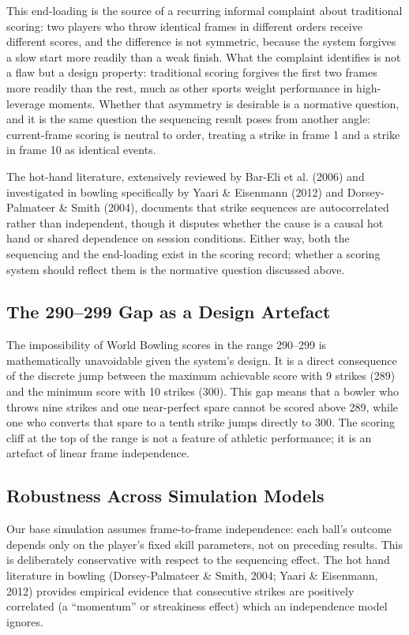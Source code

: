 \documentclass[
  letterpaper,
  DIV=11,
  numbers=noendperiod]{scrartcl}
\begin{document}
This end-loading is the source of a recurring informal complaint about
traditional scoring: two players who throw identical frames in different
orders receive different scores, and the difference is not symmetric,
because the system forgives a slow start more readily than a weak
finish. What the complaint identifies is not a flaw but a design
property: traditional scoring forgives the first two frames more readily
than the rest, much as other sports weight performance in high-leverage
moments. Whether that asymmetry is desirable is a normative question,
and it is the same question the sequencing result poses from another
angle: current-frame scoring is neutral to order, treating a strike in
frame 1 and a strike in frame 10 as identical events.

The hot-hand literature, extensively reviewed by Bar-Eli et al. (2006)
and investigated in bowling specifically by Yaari \& Eisenmann (2012)
and Dorsey-Palmateer \& Smith (2004), documents that strike sequences
are autocorrelated rather than independent, though it disputes whether
the cause is a causal hot hand or shared dependence on session
conditions. Either way, both the sequencing and the end-loading exist in
the scoring record; whether a scoring system should reflect them is the
normative question discussed above.

\subsection{The 290--299 Gap as a Design
Artefact}\label{the-290299-gap-as-a-design-artefact}

The impossibility of World Bowling scores in the range 290--299 is
mathematically unavoidable given the system's design. It is a direct
consequence of the discrete jump between the maximum achievable score
with 9 strikes (289) and the minimum score with 10 strikes (300). This
gap means that a bowler who throws nine strikes and one near-perfect
spare cannot be scored above 289, while one who converts that spare to a
tenth strike jumps directly to 300. The scoring cliff at the top of the
range is not a feature of athletic performance; it is an artefact of
linear frame independence.

\subsection{Robustness Across Simulation
Models}\label{robustness-across-simulation-models}

Our base simulation assumes frame-to-frame independence: each ball's
outcome depends only on the player's fixed skill parameters, not on
preceding results. This is deliberately conservative with respect to the
sequencing effect. The hot hand literature in bowling (Dorsey-Palmateer
\& Smith, 2004; Yaari \& Eisenmann, 2012) provides empirical evidence
that consecutive strikes are positively correlated (a ``momentum'' or
streakiness effect) which an independence model ignores.
\end{document}
